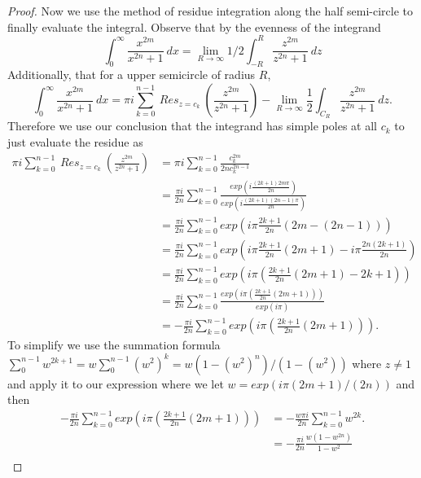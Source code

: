 \documentclass[11pt]{amsart}
\theoremstyle{definition}
\numberwithin{theorem}{section}
\numberwithin{definition}{section}
\numberwithin{equation}{section}
\newcommand{\parens}[1]{ \left( #1 \right) }
\begin{document}
\begin{proof}
	Now we use the method of residue integration along the half semi-circle to finally evaluate the integral. Observe
	that by the evenness of the integrand
	\begin{equation*}
		\int_0^\infty \frac{x^{2m}}{x^{2n}+1}\ dx = \lim_{R\to\infty }1/2\int_{-R}^R \frac{z^{2m}}{z^{2n}+1}\ dz
	\end{equation*}
	Additionally, that for a upper semicircle of radius $R$, 
	\begin{equation*}
		 \int_0^\infty \frac{x^{2m}}{x^{2n}+1}\ dx = \pi i \sum_{k=0}^{n-1}\ Res_{z= c_k}\ \parens{\frac{z^{2m}}{z^{2n}+1}} - \lim_{R\to\infty } \frac{1}{2}\int_{C_R} \frac{z^{2m}}{z^{2n}+1}\ dz.
	\end{equation*}
	Therefore we use our conclusion that the integrand has simple poles at all $c_k$ to just evaluate the residue as 
	\begin{equation*}
	\begin{aligned}
	\pi i \sum_{k=0}^{n-1}\ Res_{z= c_k}\ \parens{\frac{z^{2m}}{z^{2n}+1}} &= \pi i \sum_{k=0}^{n-1}\frac{c_k^{2m}}{2n c_k^{2n-1}}  \\
	&=  \frac{\pi i}{2n} \sum_{k=0}^{n-1} \frac{exp\parens{i\frac{(2k+1)2m\pi}{2n}}}{exp\parens{i\frac{(2k+1)(2n-1)\pi}{2n}}}\\
	&=  \frac{\pi i}{2n} \sum_{k=0}^{n-1} exp\parens{i\pi \frac{2k+1}{2n}(2m  - (2n - 1))}\\
	&=  \frac{\pi i}{2n} \sum_{k=0}^{n-1} exp\parens{i\pi \frac{2k+1}{2n}(2m + 1) - i\pi \frac{2n(2k+1)}{2n}}\\
	&=  \frac{\pi i}{2n} \sum_{k=0}^{n-1} exp\parens{i\pi \parens{\frac{2k+1}{2n}(2m + 1) - 2k+1}}\\
	&=  \frac{\pi i}{2n} \sum_{k=0}^{n-1} \frac{exp\parens{i\pi \parens{\frac{2k+1}{2n}(2m + 1)}} }{exp(i\pi)} \\
	&=  -\frac{\pi i}{2n} \sum_{k=0}^{n-1} exp\parens{i\pi \parens{\frac{2k+1}{2n}(2m + 1)}}.
	\end{aligned}
	\end{equation*}
	To simplify we use the summation formula $\sum_0^{n-1} w^{2k+1} = w\sum_{0}^{n-1} {(w^2)^k} = w(1-(w^2)^n)/(1-(w^2))$ where $z \neq 1$ and apply it to our expression where we let $w = exp(i\pi(2m+1)/(2n))$ and then
	\begin{equation*}
	\begin{aligned}
		-\frac{\pi i}{2n} \sum_{k=0}^{n-1} exp\parens{i\pi \parens{\frac{2k+1}{2n}(2m + 1)}} 
			&= - \frac{w \pi i}{2n} \sum_{k=0}^{n-1} w^{2k}. \\
			&= - \frac{\pi i}{2n} \frac{w(1-w^{2n})}{1- w^2} \\

\end{aligned}
\end{equation*}
\end{proof}
\end{document}
